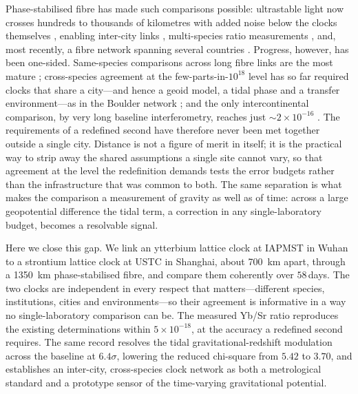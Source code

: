 \documentclass[11pt,a4paper]{article}
\begin{document}
Phase-stabilised fibre has made such comparisons possible: ultrastable
light now crosses hundreds to thousands of kilometres with added noise
below the clocks themselves \citep{schioppo2022cavities,
chen2026dissemination}, enabling inter-city links
\citep{lisdat2016network}, multi-species ratio measurements
\citep{beloy2021bacon}, and, most recently, a fibre network spanning
several countries \citep{pizzocaro2026european}. Progress, however, has
been one-sided. Same-species comparisons across long fibre links are the
most mature \citep{lisdat2016network, lindvall2025coordinated,
pizzocaro2026european}; cross-species agreement at the
few-parts-in-$10^{18}$ level has so far required clocks that share a
city---and hence a geoid model, a tidal phase and a transfer
environment---as in the Boulder network \citep{beloy2021bacon,
aeppli2026nist}; and the only intercontinental comparison, by very long
baseline interferometry, reaches just $\sim2\times10^{-16}$
\citep{pizzocaro2021vlbi}. The requirements of a redefined second have
therefore never been met together outside a single city. Distance is not
a figure of merit in itself; it is the practical way to strip away the
shared assumptions a single site cannot vary, so that agreement at the
level the redefinition demands tests the error budgets rather than the
infrastructure that was common to both. The same separation is what makes
the comparison a measurement of gravity as well as of time: across a
large geopotential difference the tidal term, a correction in any
single-laboratory budget, becomes a resolvable signal.

Here we close this gap. We link an ytterbium lattice clock at IAPMST in
Wuhan to a strontium lattice clock at USTC in Shanghai, about
\qty{700}{km} apart, through a \qty{1350}{km} phase-stabilised fibre, and
compare them coherently over $58$\,days. The two clocks are independent in
every respect that matters---different species, institutions, cities and
environments---so their agreement is informative in a way no
single-laboratory comparison can be. The measured Yb/Sr ratio reproduces
the existing determinations within $5\times10^{-18}$, at the accuracy a
redefined second requires. The same record resolves the tidal
gravitational-redshift modulation across the baseline at $6.4\sigma$,
lowering the reduced chi-square from $5.42$ to $3.70$, and establishes an
inter-city, cross-species clock network as both a metrological standard
and a prototype sensor of the time-varying gravitational potential.

\end{document}
